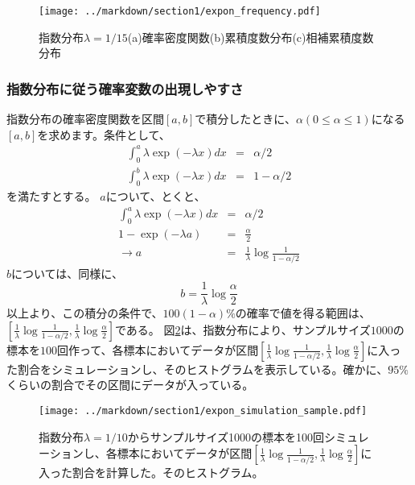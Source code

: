 \documentclass[a4paper,11pt,dvipdfmx]{jsarticle}
\begin{document}
\begin{figure}
    \begin{center}
        \texttt{[image: ../markdown/section1/expon\_frequency.pdf]}
        \caption{指数分布$\lambda=1/15$(a)確率密度関数(b)累積度数分布(c)相補累積度数分布}
        \label{expon_frequency}
    \end{center}
\end{figure}


\subsubsection{指数分布に従う確率変数の出現しやすさ}
指数分布の確率密度関数を区間$[a,b]$で積分したときに、$\alpha(0\leq \alpha \leq 1)$になる$[a,b]$を求めます。条件として、
\begin{eqnarray*}
    \int_0^{a}  \lambda\exp(-\lambda x )dx &=& \alpha/2\\
    \int_0^{b} \lambda\exp(-\lambda x )dx &=& 1-\alpha/2
\end{eqnarray*}
を満たすとする。
$a$について、とくと、
\begin{eqnarray*}
    \int_0^{a}  \lambda\exp(-\lambda x )dx &=& \alpha/2\\
     1-\exp(-\lambda a) &=& \frac{\alpha}{2}\\
     \rightarrow a&=& \frac{1}{\lambda} \log\frac{1}{1-\alpha/2}
\end{eqnarray*}
$b$については、同様に、
\begin{equation*}
    b = \frac{1}{\lambda}\log\frac{\alpha}{2}
\end{equation*}
以上より、この積分の条件で、$100(1-\alpha)\%$の確率で値を得る範囲は、$[\frac{1}{\lambda} \log\frac{1}{1-\alpha/2} ,\frac{1}{\lambda}\log\frac{\alpha}{2}]$である。
図\ref{fig:expon_simulation_sample}は、指数分布により、サンプルサイズ$1000$の標本を$100$回作って、各標本においてデータが区間$[\frac{1}{\lambda} \log\frac{1}{1-\alpha/2} ,\frac{1}{\lambda}\log\frac{\alpha}{2}]$に入った割合をシミュレーションし、そのヒストグラムを表示している。確かに、$95\%$くらいの割合でその区間にデータが入っている。


\begin{figure}
    \begin{center}
        \texttt{[image: ../markdown/section1/expon\_simulation\_sample.pdf]}
        \caption{指数分布$\lambda=1/10$からサンプルサイズ1000の標本を100回シミュレーションし、各標本においてデータが区間$[\frac{1}{\lambda} \log\frac{1}{1-\alpha/2} ,\frac{1}{\lambda}\log\frac{\alpha}{2}]$に入った割合を計算した。そのヒストグラム。}
        \label{fig:expon_simulation_sample}

    \end{center}
\end{figure}
\end{document}
